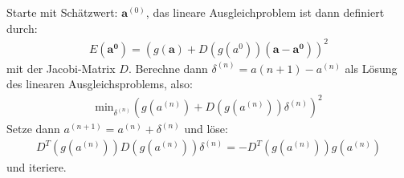 \documentclass{scrartcl}
\begin{document}
Starte mit Schätzwert: $\boldsymbol{a}^{(0)}$, das lineare Ausgleichproblem ist dann definiert durch:
\begin{align*}
E(\boldsymbol{a^0}) = (g(\boldsymbol{a})+ D(g(a^0))(\boldsymbol{a}-\boldsymbol{a^0}))^2
\end{align*}
mit der Jacobi-Matrix $D$.
Berechne dann $\delta^{(n)}=a{(n+1)}-a^{(n)}$ als Lösung des linearen Ausgleichsproblems, also:
\begin{align*}
\text{min}_{\delta^{(n)}}(g(a^{(n)})+D(g(a^{(n)})) \delta^{(n)})^2
\end{align*}
Setze dann $a^{(n+1)}= a^{(n)}+ \delta ^{(n)}$ und löse:
\begin{align*}
D^T(g(a^{(n)})) D(g(a^{(n)})) \delta^{(n)} = - D^T(g(a^{(n)})) g(a^{(n)})
\end{align*}
und iteriere.
\end{document}
